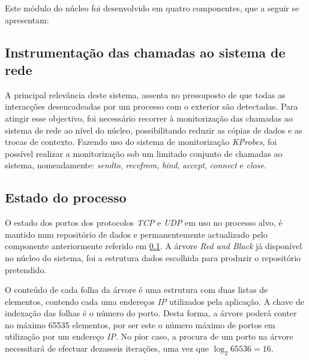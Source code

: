 Este módulo do núcleo foi desenvolvido em quatro componentes, que a seguir se apresentam:



\subsection{Instrumentação das chamadas ao sistema de rede}
\label{sub:mon_syscalls}

A principal relevância deste sistema, assenta no pressuposto de que todas as interacções desencadeadas por um processo com o exterior são detectadas.
Para atingir esse objectivo, foi necessário recorrer à monitorização das chamadas ao sistema de rede ao nível do núcleo, possibilitando reduzir as cópias de dados e as trocas de contexto.
Fazendo uso do sistema de monitorização \textit{KProbes}, foi possível realizar a monitorização sob um limitado conjunto de chamadas ao sistema, nomeadamente: \textit{sendto}, \textit{recvfrom}, \textit{bind}, \textit{accept}, \textit{connect} e \textit{close}.



\subsection{Estado do processo}
\label{sub:data_repository}

O estado dos portos dos protocolos \textit{TCP} e \textit{UDP} em uso no processo alvo, é mantido num repositório de dados e permanentemente actualizado pelo componente anteriormente referido em \ref{sub:mon_syscalls}.
A árvore \textit{Red and Black} já disponível no núcleo do sistema, foi a estrutura dados escolhida para produzir o repositório pretendido.

O conteúdo de cada folha da árvore é uma estrutura com duas listas de elementos, contendo cada uma endereços \textit{IP} utilizados pela aplicação.
A chave de indexação das folhas é o número do porto.
Desta forma, a árvore poderá conter no máximo 65535 elementos, por ser este o número máximo de portos em utilização por um endereço \textit{IP}.
No pior caso, a procura de um porto na árvore necessitará de efectuar dezasseis iterações, uma vez que \begin{math}\log _2 65536 = 16 \end{math}.

